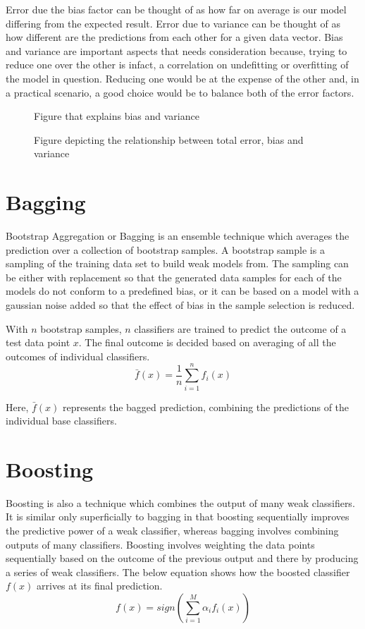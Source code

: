 \documentclass{acmtog} %
\begin{document}
Error due the bias factor can be thought of as how far on average is our model differing from the expected result. Error due to variance can be thought of as how different are the predictions from each other for a given data vector. Bias and variance are important aspects that needs consideration because, trying to reduce one over the other is infact, a correlation on undefitting or overfitting of the model in question. Reducing one would be at the expense of the other and, in a practical scenario, a good choice would be to balance both of the error factors. 
\begin{figure}
	\centering
	\def\svgwidth{\columnwidth}
	
	\caption{Figure that explains bias and variance}
\end{figure}
\begin{figure}
	\centering
	\def\svgwidth{\columnwidth}
	
	\caption{Figure depicting the relationship between total error, bias and variance}
\end{figure}
\section{Bagging}
Bootstrap Aggregation or Bagging is an ensemble technique which averages the prediction over a collection of bootstrap samples. A bootstrap sample is a sampling of the training data set to build weak models from. The sampling can be either with replacement so that the generated data samples for each of the models do not conform to a predefined bias, or it can be based on a model with a gaussian noise added so that the effect of bias in the sample selection is reduced.

With $n$ bootstrap samples, $n$ classifiers are trained to predict the outcome of a test data point $x$. The final outcome is decided based on averaging of all the outcomes of individual classifiers.
\begin{equation}
	\bar{f}(x) = \frac{1}{n}\sum^n_{i=1} f_i(x)
\label{eq:baggingEq}
\end{equation}

Here, $\bar{f}(x)$ represents the bagged prediction, combining the predictions of the individual base classifiers.

\section{Boosting}
Boosting is also a technique which combines the output of many weak classifiers. It is similar only superficially to bagging in that boosting sequentially improves the predictive power of a weak classifier, whereas bagging involves combining outputs of many classifiers. Boosting involves weighting the data points sequentially based on the outcome of the previous output and there by producing a series of weak classifiers.
The below equation shows how the boosted classifier $f(x)$ arrives at its final prediction.
\begin{equation}
	f(x) = sign(\sum^M_{i=1} \alpha _i f_i(x))
\label{eq:boostingEq}
\end{equation}
\end{document}
